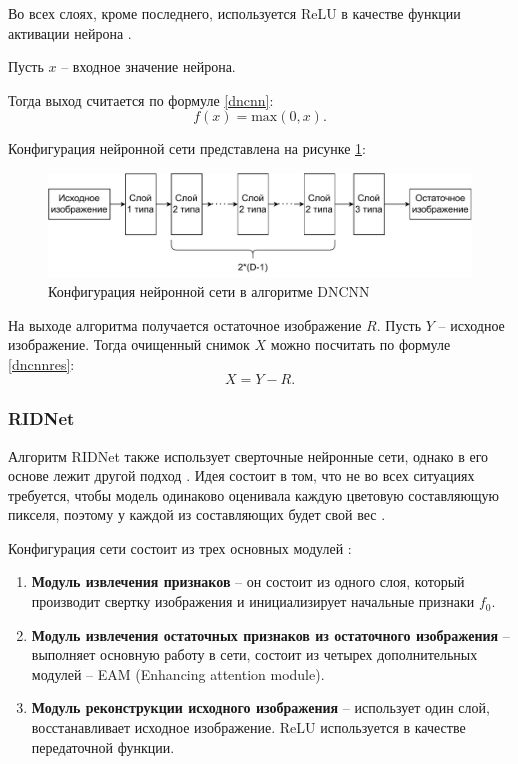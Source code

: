 Во всех слоях, кроме последнего, используется ReLU в качестве функции активации нейрона \cite{dcnn}. 

Пусть $x$ -- входное значение нейрона. 

Тогда выход считается по формуле \eqref{dncnn}: 
\begin{equation}
	\label{dncnn}
	f(x) = \mathrm{max}(0, x).
\end{equation}

Конфигурация нейронной сети представлена на рисунке \ref{fig::dncnn}:
\FloatBarrier
\begin{figure}[h]	
	\begin{center}
		\includegraphics[width=\linewidth]{inc/pdf/dnn.pdf}
	\end{center}
	\captionsetup{justification=centering}
	\caption{Конфигурация нейронной сети в алгоритме DNCNN}
	\label{fig::dncnn}
\end{figure}
\FloatBarrier

\newpage
На выходе алгоритма получается остаточное изображение $R$. 
Пусть $Y$ -- исходное изображение.
Тогда очищенный снимок $X$ можно посчитать по формуле \eqref{dncnnres}:
\begin{equation}
	\label{dncnnres}
	X = Y - R.
\end{equation}

\subsubsection{RIDNet}
Алгоритм RIDNet также использует сверточные нейронные сети, однако в его основе лежит другой подход \cite{ridnet2}.
Идея состоит в том, что не во всех ситуациях требуется, чтобы модель одинаково оценивала каждую цветовую составляющую пикселя, поэтому у каждой из составляющих будет свой вес \cite{ridnet}.

Конфигурация сети состоит из трех основных модулей \cite{ridnet}: 
\begin{enumerate}
	\item \textbf{Модуль извлечения признаков} -- он состоит из одного слоя, который производит свертку изображения и инициализирует начальные признаки $f_0$.
	\item \textbf{Модуль извлечения остаточных признаков из остаточного изображения} -- выполняет основную работу в сети, состоит из четырех дополнительных модулей -- EAM (Enhancing attention module).
	\item  \textbf{Модуль реконструкции исходного изображения} -- использует один слой, восстанавливает исходное изображение. ReLU используется в качестве передаточной функции.
\end{enumerate}

